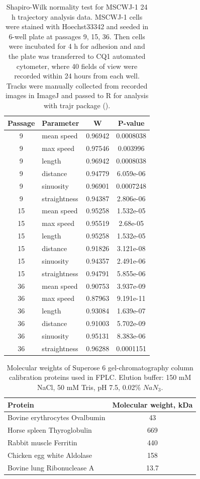 \documentclass[alpha-refs]{wiley-article}
\begin{document}
\begin{table}[hbt!]
  \caption{Shapiro-Wilk normality test for MSCWJ-1 24 h trajectory analysis data. MSCWJ-1 cells were stained with Hoechst33342 and seeded in 6-well plate at passages 9, 15, 36.
  Then cells were incubated for 4 h for adhesion and and the plate was transferred to CQ1 automated cytometer, where 40 fields of view were recorded within 24 hours from each well.
  Tracks were manually collected from recorded images in ImageJ and passed to R for analysis with trajr package (\cite{mclean2018trajr}).}
\centering
\begin{tabular}{|c|l|c|c|}
    \hline
 Passage & Parameter & W & P-value \\
   \hline
9 & mean speed & 0.96942 & 0.0008038 \\
9 & max speed & 0.97546 &  0.003996 \\
9 & length & 0.96942 & 0.0008038 \\
9 & distance & 0.94779 & 6.059e-06 \\
9 & sinuosity & 0.96901 & 0.0007248 \\
9 & straightness & 0.94387 & 2.806e-06 \\
15 & mean speed & 0.95258 & 1.532e-05 \\
15 & max speed & 0.95519 &  2.68e-05 \\
15 & length & 0.95258 & 1.532e-05 \\
15 & distance & 0.91826 & 3.121e-08 \\
15 & sinuosity & 0.94357 & 2.491e-06 \\
15 & straightness & 0.94791 & 5.855e-06 \\
36 & mean speed & 0.90753 & 3.937e-09 \\
36 & max speed & 0.87963 &  9.191e-11 \\
36 & length & 0.93084 & 1.639e-07 \\
36 & distance & 0.91003 & 5.702e-09 \\
36 & sinuosity & 0.95131 & 8.383e-06 \\
36 & straightness & 0.96288 & 0.0001151
\end{tabular}
\end{table}

\begin{table}[hbt!]
  \caption{Molecular weights of Superose 6  gel-chromatography column calibration proteins used in FPLC.
Elution buffer: 150 mM NaCl, 50 mM Tris, pH 7.5, 0.02\% $NaN_3$.
}
\centering
\begin{tabular}{|l|c|}
 Protein & Molecular weight, kDa  \\
 \hline
 Bovine erythrocytes Ovalbumin & 43 \\
 Horse spleen Thyroglobulin & 669 \\
 Rabbit muscle Ferritin & 440 \\
 Chicken egg white Aldolase & 158 \\
 Bovine lung Ribonuclease A & 13.7
\end{tabular}
\begin{tablenotes}
  \item
\end{tablenotes}
\end{table}
\end{document}
